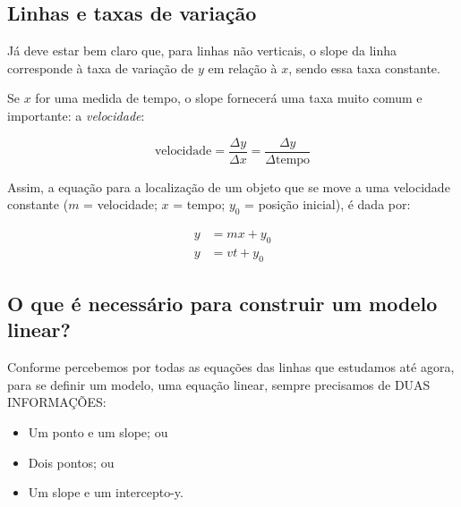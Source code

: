 \documentclass[pdftex, brazil, 12pt, twoside]{article}
\begin{document}
\subsection{Linhas e taxas de variação}
\label{modelagem-linear-linhas-taxa-variacao}

Já deve estar bem claro que, para linhas não verticais, o slope da linha corresponde
à taxa de variação de $y$ em relação à $x$, sendo essa taxa constante.

Se $x$ for
uma medida de tempo, o slope fornecerá uma taxa muito comum e importante: a \emph{velocidade}:

\begin{equation}
  \text{velocidade} = \frac{\Delta y}{\Delta x} = \frac{\Delta y}{\Delta \text{tempo}}
\end{equation}

Assim, a equação para a localização de um objeto que se move a uma velocidade constante
($m$ = velocidade; $x$ = tempo; $y_0$ = posição inicial), é dada por:

\begin{equation}
  \begin{split}
    y & = mx + y_0\\
    y & = vt + y_0
  \end{split}
\end{equation}


\subsection{O que é necessário para construir um modelo linear?}
\label{modelagem-linear-necessario-para-modelo}

Conforme percebemos por todas as equações das linhas que estudamos até agora,
para se definir um modelo, uma equação linear, sempre precisamos de DUAS INFORMAÇÕES:

\begin{itemize}[noitemsep]
\item Um ponto e um slope; ou
\item Dois pontos; ou
\item Um slope e um intercepto-y.
\end{itemize}
\end{document}
